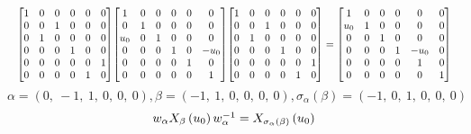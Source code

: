 \documentclass[11pt]{article}
\theoremstyle{definition}
\begin{document}
\[
\scaletoalign{\textwidth}{{\left[\begin{matrix}1 & 0 & 0 & 0 & 0 & 0\\0 & 0 & 1 & 0 & 0 & 0\\0 & 1 & 0 & 0 & 0 & 0\\0 & 0 & 0 & 1 & 0 & 0\\0 & 0 & 0 & 0 & 0 & 1\\0 & 0 & 0 & 0 & 1 & 0\end{matrix}\right]} {\left[\begin{matrix}1 & 0 & 0 & 0 & 0 & 0\\0 & 1 & 0 & 0 & 0 & 0\\u_{0} & 0 & 1 & 0 & 0 & 0\\0 & 0 & 0 & 1 & 0 & - u_{0}\\0 & 0 & 0 & 0 & 1 & 0\\0 & 0 & 0 & 0 & 0 & 1\end{matrix}\right]} {\left[\begin{matrix}1 & 0 & 0 & 0 & 0 & 0\\0 & 0 & 1 & 0 & 0 & 0\\0 & 1 & 0 & 0 & 0 & 0\\0 & 0 & 0 & 1 & 0 & 0\\0 & 0 & 0 & 0 & 0 & 1\\0 & 0 & 0 & 0 & 1 & 0\end{matrix}\right]} = {\left[\begin{matrix}1 & 0 & 0 & 0 & 0 & 0\\u_{0} & 1 & 0 & 0 & 0 & 0\\0 & 0 & 1 & 0 & 0 & 0\\0 & 0 & 0 & 1 & - u_{0} & 0\\0 & 0 & 0 & 0 & 1 & 0\\0 & 0 & 0 & 0 & 0 & 1\end{matrix}\right]}}
\]
\[
\alpha = \left( 0, \  -1, \  1, \  0, \  0, \  0\right), \beta = \left( -1, \  1, \  0, \  0, \  0, \  0\right), \sigma_{\alpha}(\beta) = \left( -1, \  0, \  1, \  0, \  0, \  0\right)
\]
\[
\scaletoalign{\textwidth}{w_{\alpha} X_{\beta}\left(u_{0}\right) w_{\alpha}^{-1} = X_{\sigma_{\alpha}\left(\beta\right)}\left(u_{0}\right)}
\]
\end{document}
